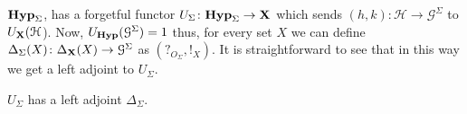 \documentclass[a4paper,UKenglish,cleveref,pdftex,thm-restate,numberwithinsect]{lipics-v2021}
\newcommand{\lgh}{\mathsf{lg}}
\def\X{\textbf {\textup{X}}}
\newcommand{\catname}[1]{\textbf{\textup{#1}}}
\newcommand{\hyp}{\catname{Hyp}}
\newcommand{\ari}{\mathsf{ar}}
\begin{document}

$\hyp_{\Sigma}$, has a forgetful functor $U_{\Sigma}\colon \hyp_{\Sigma}\to \X$ which sends $(h,k)\colon \mathcal{H}\to \mathcal{G}^{\Sigma}$ to $U_{\X}(\mathcal{H}$). Now, $U_{\hyp}(\mathcal{G}^{\Sigma})=1$ thus, for every set $X$ we can define $\Delta_{\Sigma}(X)\colon \Delta_{\X}(X)\to \mathcal{G}^{\Sigma}$  as $(?_{O_\Sigma}, !_{X})$. It is straightforward to see that in this way we get a left adjoint to $U_\Sigma$.

\begin{proposition} $U_\Sigma$
	has a left adjoint $\Delta_\Sigma$.
\end{proposition}
\iffalse 
\begin{proof}Let $(h, !_{V_\mathcal{H}})\colon \mathcal{H}\to \mathcal{G}^{\Sigma}$ be an object of $\hyp_{\Sigma}$, and suppose that there exists $f\colon X\to U_{\Sigma}(\mathcal{H})$. Since, $U_{\Sigma}(\mathcal{H})=U_{\X}(\mathcal{H})$ and the identity is the unit of $\Delta_\hyp \dashv U_{\hyp}$, we get a morphism $(?_{E_{\mathcal{H}}},f)\colon \Delta_{\X}(X)\to \mathcal{H}$ of $\hyp$. And then the thesis follows since we have
	\[
	(h, !_{V_{\mathcal{{H}}}})\circ (?_{E_{\mathcal{H}}}, f)=(h\circ ?_{E_{\mathcal{H}}}, !_{V_{\mathcal{{H}}}}\circ f)=(?_{0_{\Sigma}}, !_{X})=\Delta_{\hyp}(X)\]
\end{proof}
\fi 
\end{document}
